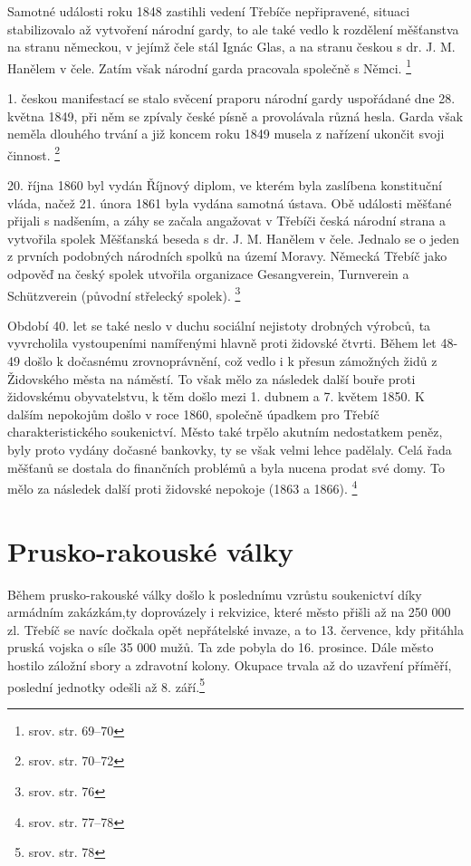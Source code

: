 \documentclass[a4paper,oneside,12pt]{report}
\begin{document}
Samotné události roku 1848 zastihli vedení Třebíče nepřipravené, situaci stabilizovalo až vytvoření národní gardy, to ale také vedlo k rozdělení měšťanstva na stranu německou, v jejímž čele stál Ignác Glas, a na stranu českou s dr. J. M. Hanělem v čele.
Zatím však národní garda pracovala společně s Němci. \footnote{srov. \cite{Janak1981} str. 69--70}

1. českou manifestací se stalo svěcení praporu národní gardy uspořádané dne 28. května 1849, při něm se zpívaly české písně a provolávala různá hesla.
Garda však neměla dlouhého trvání a již koncem roku 1849 musela z nařízení ukončit svoji činnost. \footnote{srov. \cite{Janak1981} str. 70--72}

20. října 1860 byl vydán Říjnový diplom, ve kterém byla zaslíbena konstituční vláda, načež 21. února 1861 byla vydána samotná ústava.
Obě události měšťané přijali s nadšením, a záhy se začala angažovat v Třebíči česká národní strana a vytvořila spolek Měšťanská beseda s dr. J. M. Hanělem v čele.
Jednalo se o jeden z prvních podobných národních spolků na území Moravy.
Německá Třebíč jako odpověď na český spolek utvořila organizace Gesangverein, Turnverein a Schützverein (původní střelecký spolek). \footnote{srov. \cite{Janak1981} str. 76}

Období 40. let se také neslo v duchu sociální nejistoty drobných výrobců, ta vyvrcholila vystoupeními namířenými hlavně proti židovské čtvrti.
Během let 48-49 došlo k dočasnému zrovnoprávnění, což vedlo i k přesun zámožných židů z Židovského města na náměstí.
To však mělo za následek další bouře proti židovskému obyvatelstvu, k těm došlo mezi 1. dubnem a 7. květem 1850.
K dalším nepokojům došlo v roce 1860, společně úpadkem pro Třebíč charakteristického soukenictví.
Město také trpělo akutním nedostatkem peněz, byly proto vydány dočasné bankovky, ty se však velmi lehce padělaly.
Celá řada měšťanů se dostala do finančních problémů a byla nucena prodat své domy.
To mělo za následek další proti židovské nepokoje (1863 a 1866). \footnote{srov. \cite{Janak1981} str. 77--78}

\section{Prusko-rakouské války}

Během prusko-rakouské války došlo k poslednímu vzrůstu soukenictví díky armádním zakázkám,ty doprovázely i rekvizice, které město přišli až na 250 000 zl.
Třebíč se navíc dočkala opět nepřátelské invaze, a to 13. července, kdy přitáhla pruská vojska o síle 35 000 mužů.
Ta zde pobyla do 16. prosince.
Dále město hostilo záložní sbory a zdravotní kolony.
Okupace trvala až do uzavření příměří, poslední jednotky odešli až 8. září.\footnote{srov. \cite{Janak1981} str. 78}
\end{document}
